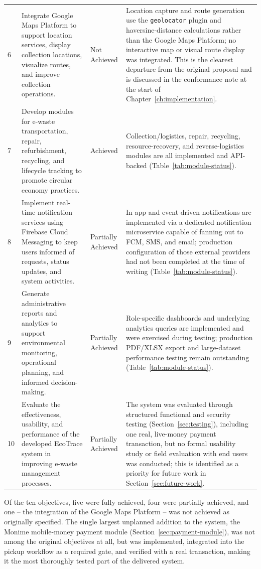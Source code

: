 \begin{longtable}{@{}p{0.6cm}p{6.6cm}p{2.4cm}p{4.3cm}@{}}
6 & Integrate Google Maps Platform to support location services, display collection locations, visualize routes, and improve collection operations. & Not Achieved & Location capture and route generation use the \texttt{geolocator} plugin and haversine-distance calculations rather than the Google Maps Platform; no interactive map or visual route display was integrated. This is the clearest departure from the original proposal and is discussed in the conformance note at the start of Chapter~\ref{ch:implementation}. \\
7 & Develop modules for e-waste transportation, repair, refurbishment, recycling, and lifecycle tracking to promote circular economy practices. & Achieved & Collection/logistics, repair, recycling, resource-recovery, and reverse-logistics modules are all implemented and API-backed (Table~\ref{tab:module-status}). \\
8 & Implement real-time notification services using Firebase Cloud Messaging to keep users informed of requests, status updates, and system activities. & Partially Achieved & In-app and event-driven notifications are implemented via a dedicated notification microservice capable of fanning out to FCM, SMS, and email; production configuration of those external providers had not been completed at the time of writing (Table~\ref{tab:module-status}). \\
9 & Generate administrative reports and analytics to support environmental monitoring, operational planning, and informed decision-making. & Partially Achieved & Role-specific dashboards and underlying analytics queries are implemented and were exercised during testing; production PDF/XLSX export and large-dataset performance testing remain outstanding (Table~\ref{tab:module-status}). \\
10 & Evaluate the effectiveness, usability, and performance of the developed EcoTrace system in improving e-waste management processes. & Partially Achieved & The system was evaluated through structured functional and security testing (Section~\ref{sec:testing}), including one real, live-money payment transaction, but no formal usability study or field evaluation with end users was conducted; this is identified as a priority for future work in Section~\ref{sec:future-work}. \\
\bottomrule
\end{longtable}

Of the ten objectives, five were fully achieved, four were partially
achieved, and one -- the integration of the Google Maps Platform -- was not
achieved as originally specified. The single largest unplanned addition to
the system, the Monime mobile-money payment module
(Section~\ref{sec:payment-module}), was not among the original objectives
at all, but was implemented, integrated into the pickup workflow as a
required gate, and verified with a real transaction, making it the most
thoroughly tested part of the delivered system.

